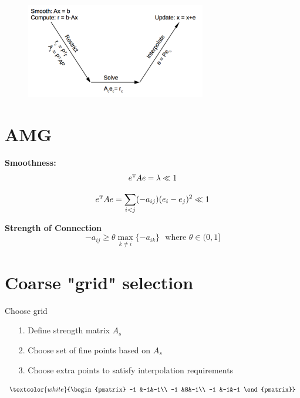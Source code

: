 \documentclass{beamer}
\newcommand{\wh}[1]{\textcolor{white}     {#1}}
\begin{document}
\begin{frame}
\begin{figure}
\begin{centering}
\includegraphics[width=0.7\textwidth]{../figures/TwoGrid.png}
\end{centering}
\end{figure}
\end{frame}


\section{AMG}
\begin{frame}

\textbf{Smoothness:}
$$e^{\mbox{\tiny{T}}}Ae = \lambda \ll 1$$


$$e^{\mbox{\tiny{T}}}Ae = \sum_{i<j} (-a_{ij})(e_i-e_j)^2 \ll 1$$


\textbf{Strength of Connection}
$$-a_{ij}\geq \theta \max_{k\neq i} \{-a_{ik}\} \ \ \ \mbox{where } \theta \in (0,1]$$


\end{frame}


\section{Coarse "grid" selection}


\begin{frame}



Choose grid
\begin{itemize}
  \item[1.] Define strength matrix $A_s$
  \item[2.] Choose set of fine points based on $A_s$
  \item[3.] Choose extra points to satisfy interpolation requirements
\end{itemize}

\vspace{.5in}

\begin{equation} \nonumber
 \wh{\begin{pmatrix}
     -1 &-1&-1\\
     -1 &8&-1\\
     -1 &-1&-1
   \end{pmatrix}}
\end{equation}

\end{frame}
\end{document}
